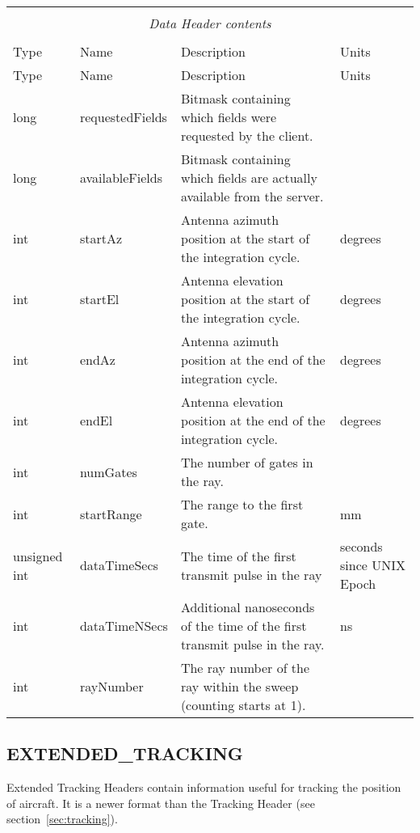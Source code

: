 \documentclass[10pt]{article}
\newcommand{\tblspc}{\rule{0pt}{3ex}}
\begin{document}
\begin{longtable}{|p{}|l|p{}|p{}|}
\hline
\multicolumn{4}{|c|}{} \\
\multicolumn{4}{|c|}{\emph{Data Header contents}} \\
\multicolumn{4}{|c|}{} \\
\hline Type & Name & Description & Units \\ \hline \endfirsthead
\hline Type & Name & Description & Units \\ \hline \endhead
\hline \endfoot
\tblspc long & requestedFields & Bitmask containing which fields were requested by the client. & \\
\hline
\tblspc long & availableFields & Bitmask containing which fields are actually available from the server. & \\
\hline
\tblspc int & startAz & Antenna azimuth position at the start of the integration cycle. & degrees \\
\hline
\tblspc int & startEl & Antenna elevation position at the start of the integration cycle. & degrees \\
\hline
\tblspc int & endAz & Antenna azimuth position at the end of the integration cycle. & degrees \\
\hline
\tblspc int & endEl & Antenna elevation position at the end of the integration cycle. & degrees \\
\hline
\tblspc int & numGates & The number of gates in the ray. & \\
\hline
\tblspc int & startRange & The range to the first gate. & mm \\
\hline
\tblspc unsigned int & dataTimeSecs & The time of the first transmit pulse in the ray & seconds since UNIX Epoch \\
\hline
\tblspc int & dataTimeNSecs & Additional nanoseconds of the time of the first transmit pulse in the ray. & ns \\
\hline
\tblspc int & rayNumber & The ray number of the ray within the sweep (counting starts at 1). & \\
\hline
\end{longtable}

\subsection{EXTENDED\_TRACKING}
\label{sec:extended_tracking}
Extended Tracking Headers contain information useful for tracking the position of aircraft. It is a newer format than the Tracking Header (see section~\ref{sec:tracking}).
\end{document}

